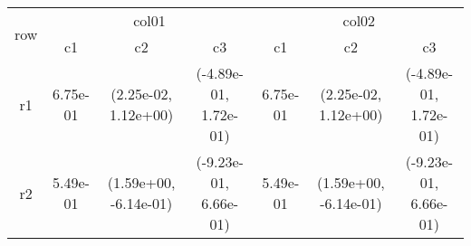 \begin{tabular}{ccccccc}
\toprule
\multirow{2}{*}{row}&\multicolumn{3}{c}{col01}&\multicolumn{3}{c}{col02}\tabularnewline
\cmidrule(lr){2-4}
\cmidrule(lr){5-7}
&c1&c2&c3&c1&c2&c3\tabularnewline
\midrule
r1&6.75e-01& (2.25e-02, 1.12e+00)& (-4.89e-01, 1.72e-01)&6.75e-01& (2.25e-02, 1.12e+00)& (-4.89e-01, 1.72e-01)\tabularnewline
r2&5.49e-01& (1.59e+00, -6.14e-01)& (-9.23e-01, 6.66e-01)&5.49e-01& (1.59e+00, -6.14e-01)& (-9.23e-01, 6.66e-01)\tabularnewline
\bottomrule
\end{tabular}
